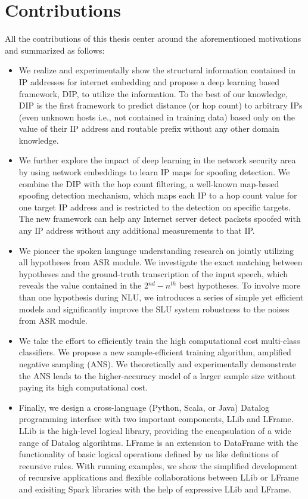 \documentclass [PhD] {uclathes}
\begin{document}
\section{Contributions}
All the contributions of this thesis center around  the aforementioned motivations and summarized as follows:
\begin{itemize}
	\item We realize and experimentally show  the structural information contained in IP addresses for internet embedding and propose a deep learning based framework, DIP, to utilize the information. To the best of our knowledge, DIP is the first framework to predict distance (or hop count) to arbitrary IPs (even unknown hosts i.e., not contained in training data) based only on the value of their IP address and routable prefix without any other domain knowledge.
	\item We further explore the impact of deep learning in the network  security area by using network embeddings to learn IP maps for spoofing detection. We  combine the DIP with the hop count filtering, a well-known map-based spoofing detection mechanism, which maps each IP to a hop count value for one target IP address and is restricted to the detection on specific targets. The new framework can help any Internet server detect packets spoofed with any IP address without any additional measurements to that IP.
	\item We pioneer the spoken language understanding research on jointly utilizing all hypotheses from ASR module. We investigate the exact matching between hypotheses and the ground-truth transcription of the input speech, which reveals the value contained in the 2$^{nd}-n^{th}$ best hypotheses. To involve more than one hypothesis during NLU, we introduces a series of simple yet efficient models and significantly improve the SLU system robustness to the noises from  ASR module. 
	\item We take the effort to efficiently train the high computational cost multi-class classifiers. We propose a new sample-efficient training algorithm, amplified negative sampling (ANS). We theoretically and experimentally demonstrate the ANS leads to the higher-accuracy model of a larger sample size without paying its high computational cost.
	\item Finally, we design a cross-language (Python, Scala, or Java) Datalog programming interface with two important components, LLib and LFrame. LLib is the high-level logical library, providing the encapsulation of a wide range of Datalog algorihtms.  LFrame is an extension to DataFrame with the functionality of basic logical operations defined by us like  definitions of recursive rules. With running examples, we show the simplified development of recursive applications   and flexible collaborations between LLib or LFrame and exisiting Spark libraries with the help of expressive LLib and LFrame.
\end{itemize}
\end{document}
